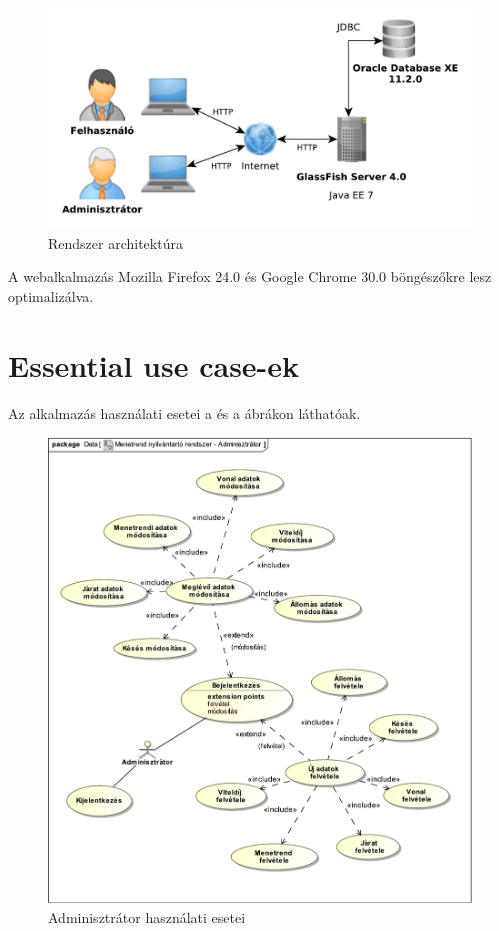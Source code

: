 \begin{figure}[!ht]
\centering
\includegraphics[width=150mm, keepaspectratio]{img/architecture}
\caption{Rendszer architektúra}
\label{fig:architecture-spec}
\end{figure}

A webalkalmazás Mozilla Firefox 24.0 és Google Chrome 30.0 böngészőkre lesz
optimalizálva.

\section*{Essential use case-ek}
Az alkalmazás használati esetei a  és a
 ábrákon láthatóak.

\begin{figure}[!ht]
\centering
\includegraphics[width=150mm, keepaspectratio]{img/use-case-administrator}
\caption{Adminisztrátor használati esetei}
\label{fig:use-case-administrator}
\end{figure}

